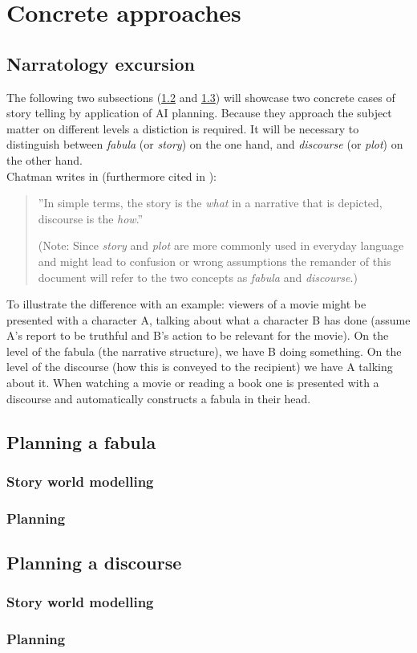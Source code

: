 \section{Concrete approaches}\label{approaches}
\subsection{Narratology excursion}
The following two subsections (\ref{fabula} and \ref{discourse}) will showcase two concrete cases of story telling by application of AI planning. Because they approach the subject matter on different levels a distiction is required. It will be necessary to distinguish between \emph{fabula} (or \emph{story}) on the one hand, and \emph{discourse} (or \emph{plot}) on the other hand.\\
Chatman writes in \cite{Chatman1980} (furthermore cited in \cite{Herman10}):
\begin{quote}
''In simple terms, the story is the \emph{what} in a narrative that is depicted, discourse is the \emph{how}.''

(Note: Since \emph{story} and \emph{plot} are more commonly used in everyday language and might lead to confusion or wrong assumptions the remander of this document will refer to the two concepts as \emph{fabula} and \emph{discourse}.)
\end{quote}
To illustrate the difference with an example: viewers of a movie might be presented with a character A, talking about what a character B has done (assume A's report to be truthful and B's action to be relevant for the movie). On the level of the fabula (the narrative structure), we have B doing something. On the level of the discourse (how this is conveyed to the recipient) we have A talking about it. When watching a movie or reading a book one is presented with a discourse and automatically constructs a fabula in their head.
\subsection{Planning a fabula}\label{fabula}
\cite{Haslum14}
\subsubsection{Story world modelling}
\subsubsection{Planning}
\subsection{Planning a discourse}\label{discourse}
\cite{Porteous10}
\subsubsection{Story world modelling}
\subsubsection{Planning}
